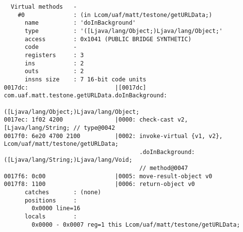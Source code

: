 \begin{lstlisting}
  Virtual methods   -
    #0              : (in Lcom/uaf/matt/testone/getURLData;)
      name          : 'doInBackground'
      type          : '([Ljava/lang/Object;)Ljava/lang/Object;'
      access        : 0x1041 (PUBLIC BRIDGE SYNTHETIC)
      code          -
      registers     : 3
      ins           : 2
      outs          : 2
      insns size    : 7 16-bit code units
0017dc:                         |[0017dc] com.uaf.matt.testone.getURLData.doInBackground:
                                          ([Ljava/lang/Object;)Ljava/lang/Object;
0017ec: 1f02 4200               |0000: check-cast v2, [Ljava/lang/String; // type@0042
0017f0: 6e20 4700 2100          |0002: invoke-virtual {v1, v2}, Lcom/uaf/matt/testone/getURLData;
                                       .doInBackground:([Ljava/lang/String;)Ljava/lang/Void;
                                       // method@0047
0017f6: 0c00                    |0005: move-result-object v0
0017f8: 1100                    |0006: return-object v0
      catches       : (none)
      positions     :
        0x0000 line=16
      locals        :
        0x0000 - 0x0007 reg=1 this Lcom/uaf/matt/testone/getURLData;


\end{lstlisting}
